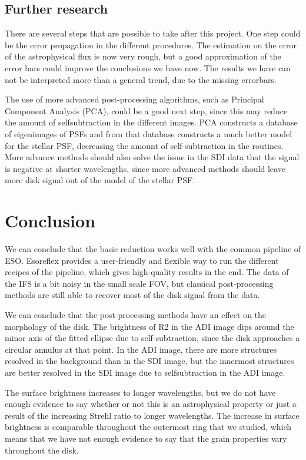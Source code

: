 \documentclass[twoside,single,12pt]{lion-msc}
\begin{document}
\section{Further research}
There are several steps that are possible to take after this project. One step could be the error propagation in the different procedures. The estimation on the error of the astrophysical flux is now very rough, but a good approximation of the error bars could improve the conclusions we have now. The results we have can not be interpreted more than a general trend, due to the missing errorbars.
\bigskip

The use of more advanced post-processing algorithms, such as Principal Component Analysis (PCA), could be a good next step, since this may reduce the amount of selfsubtraction in the different images. PCA constructs a database of eigenimages of PSFs and from that database constructs a much better model for the stellar PSF, decreasing the amount of self-subtraction in the routines. More advance methods should also solve the issue in the SDI data that the signal is negative at shorter wavelengths, since more advanced methods should leave more disk signal out of the model of the stellar PSF.

\chapter{Conclusion}
We can conclude that the basic reduction works well with the common pipeline of ESO. Esoreflex provides a user-friendly and flexible way to run the different recipes of the pipeline, which gives high-quality results in the end. The data of the IFS is a bit noisy in the small scale FOV, but classical post-processing methods are still able to recover most of the disk signal from the data.
\bigskip

We can conclude that the post-processing methods have an effect on the morphology of the disk. The brightness of R2 in the ADI image dips around the minor axis of the fitted ellipse due to self-subtraction, since the disk approaches a circular annulus at that point. In the ADI image, there are more structures resolved in the background than in the SDI image, but the innermost structures are better resolved in the SDI image due to selfsubtraction in the ADI image.
\bigskip

The surface brightness increases to longer wavelengths, but we do not have enough evidence to say whether or not this is an astrophysical property or just a result of the increasing Strehl ratio to longer wavelengths. The increase in surface brightness is comparable throughout the outermost ring that we studied, which means that we have not enough evidence to say that the grain properties vary throughout the disk.
\end{document}
